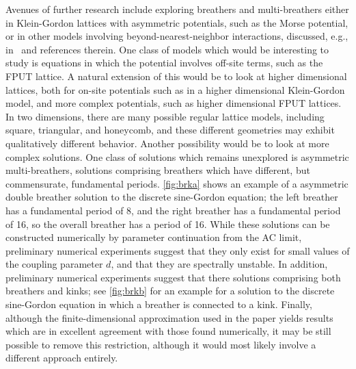 \documentclass[12pt,reqno]{amsart}
\theoremstyle{definition}
\begin{document}
Avenues of further research include exploring breathers and multi-breathers either in Klein-Gordon lattices with asymmetric potentials, such as the Morse potential, or in other models 
involving beyond-nearest-neighbor interactions, discussed, e.g., in~\cite{PENATI201992} and references therein. One class of models which would be interesting to study is equations in which the potential involves off-site terms, such as the FPUT lattice. A natural extension of this would be to look at higher dimensional lattices, both for on-site potentials such as in a higher dimensional Klein-Gordon model, and more complex potentials, such as higher dimensional FPUT lattices. In two dimensions, there are many possible regular lattice models, including square, triangular, and honeycomb, and these different geometries may exhibit qualitatively different behavior. Another possibility would be to look at more complex solutions. One class of solutions which remains unexplored is asymmetric multi-breathers, solutions comprising breathers which have different, but commensurate, fundamental periods. \cref{fig:brka} shows an example of a asymmetric double breather solution to the discrete sine-Gordon equation; the left breather has a fundamental period of 8, and the right breather has a fundamental period of 16, so the overall breather has a period of 16. While these solutions can be constructed numerically by parameter continuation from the AC limit, preliminary numerical experiments suggest that they only exist for small values of the coupling parameter $d$, and that they are spectrally unstable.
In addition, preliminary numerical experiments suggest that there solutions comprising both breathers and kinks; see \cref{fig:brkb} for an example for a solution to the discrete sine-Gordon equation in which a breather is connected to a kink. Finally, although the finite-dimensional approximation used in the paper yields results which are in excellent agreement with those found numerically, it may be still possible to remove this restriction, although it would most likely involve a different approach entirely.
\end{document}
